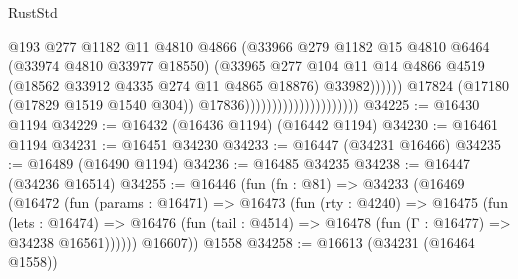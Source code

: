 \begin{lexlean}{RustStd}
\begin{coremodule}
{\begin{coremodule}
{{{{{{{{{{{{{{{{{{{{{{{{{{{{{{{{{{{{{{{{{{{{{{{{{{{{{{{                                                      @193
                                                      @277
                                                      @1182
                                                      @11
                                                      @4810
                                                      @4866
                                                      (@33966
                                                        @279
                                                        @1182
                                                        @15
                                                        @4810
                                                        @6464
                                                        (@33974 @4810 @33977 @18550)
                                                        (@33965
                                                          @277
                                                          @104
                                                          @11
                                                          @14
                                                          @4866
                                                          @4519
                                                          (@18562
                                                            @33912
                                                            @4335
                                                            @274
                                                            @11
                                                            @4865
                                                            @18876)
                                                          @33982))))))
                                              @17824
                                              (@17180 (@17829 @1519 @1540 @304))
                                              @17836)))))))))))))))))))))
@34225 := @16430 @1194
@34229 := @16432 (@16436 @1194) (@16442 @1194)
@34230 := @16461 @1194
@34231 := @16451 @34230
@34233 := @16447 (@34231 @16466)
@34235 := @16489 (@16490 @1194)
@34236 := @16485 @34235
@34238 := @16447 (@34236 @16514)
@34255 := @16446
    (fun (fn : @81) =>
    @34233
      (@16469
        (@16472
          (fun (params : @16471) =>
          @16473
            (fun (rty : @4240) =>
            @16475
              (fun (lets : @16474) =>
              @16476 (fun (tail : @4514) => @16478 (fun (Γ : @16477) => @34238 @16561))))))
        @16607))
    @1558
@34258 := @16613 (@34231 (@16464 @1558))
}}}}}}}}}}}}}}}}}}}}}}}}}}}}}}}}}}}}}}}}}}}}}}}}}}}}}}}
\end{coremodule}}
\end{coremodule}
\end{lexlean}
